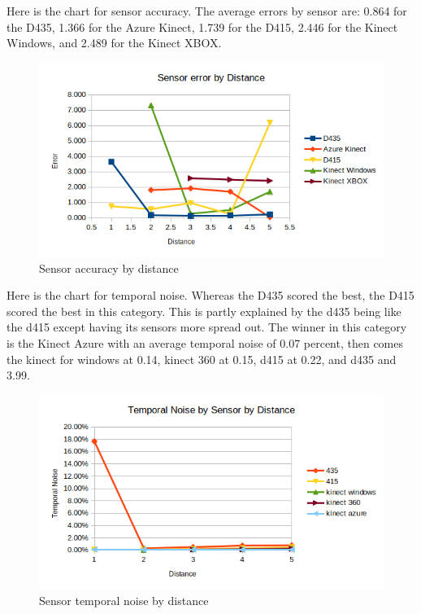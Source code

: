 Here is the chart for sensor accuracy. The average errors by sensor are: 0.864 for the D435, 1.366 for the Azure Kinect, 1.739 for the D415, 2.446 for the Kinect Windows, and 2.489 for the Kinect XBOX.
\begin{figure}[h]
	\caption{Sensor accuracy by distance}
	\centering
	\includegraphics{images/sensor_accuracy.png}
\end{figure}

Here is the chart for temporal noise. Whereas the D435 scored the best, the D415 scored the best in this category. This is partly explained by the d435 being like the d415 except having its sensors more spread out. The winner in this category is the Kinect Azure with an average temporal noise of 0.07 percent, then comes the kinect for windows at 0.14, kinect 360 at 0.15, d415 at 0.22, and d435 and 3.99.
\begin{figure}[h]
	\caption{Sensor temporal noise by distance}
	\centering
	\includegraphics{images/temporal_noise.png}
\end{figure}

